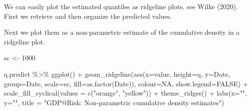 \documentclass[
  letterpaper,
]{book}
\newenvironment{Shaded}{\begin{snugshade}}{\end{snugshade}}
\newcommand{\AttributeTok}[1]{\textcolor[rgb]{0.40,0.45,0.13}{#1}}
\newcommand{\CommentTok}[1]{\textcolor[rgb]{0.37,0.37,0.37}{#1}}
\newcommand{\ConstantTok}[1]{\textcolor[rgb]{0.56,0.35,0.01}{#1}}
\newcommand{\DecValTok}[1]{\textcolor[rgb]{0.68,0.00,0.00}{#1}}
\newcommand{\FunctionTok}[1]{\textcolor[rgb]{0.28,0.35,0.67}{#1}}
\newcommand{\NormalTok}[1]{\textcolor[rgb]{0.00,0.23,0.31}{#1}}
\newcommand{\OtherTok}[1]{\textcolor[rgb]{0.00,0.23,0.31}{#1}}
\newcommand{\SpecialCharTok}[1]{\textcolor[rgb]{0.37,0.37,0.37}{#1}}
\newcommand{\StringTok}[1]{\textcolor[rgb]{0.13,0.47,0.30}{#1}}
\begin{document}
We can easily plot the estimated quantiles as ridgeline plots, see Wilke
(2020). First we retrieve and then organize the predicted values.

\begin{Shaded}
\end{Shaded}

Next we plot them as a non-parametric estimate of the cumulative density
in a ridgeline plot.

\begin{Shaded}
\begin{Highlighting}[]
\NormalTok{sc }\OtherTok{\textless{}{-}} \DecValTok{1000}

\NormalTok{q.predict }\SpecialCharTok{\%\textgreater{}\%} 
  \FunctionTok{ggplot}\NormalTok{() }\SpecialCharTok{+} 
  \FunctionTok{geom\_ridgeline}\NormalTok{(}\FunctionTok{aes}\NormalTok{(}\AttributeTok{x=}\NormalTok{value, }\AttributeTok{height=}\NormalTok{q, }\AttributeTok{y=}\NormalTok{Date, }\AttributeTok{group=}\NormalTok{Date, }\AttributeTok{scale=}\NormalTok{sc, }\AttributeTok{fill=}\FunctionTok{as.factor}\NormalTok{(Date)),  }
                          \AttributeTok{colour=}\ConstantTok{NA}\NormalTok{, }\AttributeTok{show.legend=}\ConstantTok{FALSE}\NormalTok{) }\SpecialCharTok{+}
  \FunctionTok{scale\_fill\_cyclical}\NormalTok{(}\AttributeTok{values =} \FunctionTok{c}\NormalTok{(}\StringTok{"orange"}\NormalTok{, }\StringTok{"yellow"}\NormalTok{)) }\SpecialCharTok{+}
  \FunctionTok{theme\_ridges}\NormalTok{() }\SpecialCharTok{+} 
  \FunctionTok{labs}\NormalTok{(}\AttributeTok{x=}\StringTok{""}\NormalTok{, }\AttributeTok{y=}\StringTok{""}\NormalTok{, }\AttributeTok{title =} \StringTok{"GDP@Risk: Non{-}parametric cumulative density estimates"}\NormalTok{)}
\end{Highlighting}
\end{Shaded}
\end{document}
